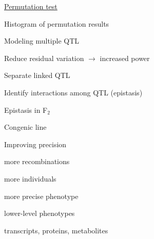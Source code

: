 \documentclass[12pt,t]{beamer}
\begin{document}
\begin{frame}[c]{\href{https://www.biostat.wisc.edu/~kbroman/presentations/SGN2017/perm_test}{\color{title} Permutation test}}


\end{frame}




\begin{frame}[c]{Histogram of permutation results}


\end{frame}


\begin{frame}[c]{Modeling multiple QTL}

\vspace{-20mm}

  \bbi
\item Reduce residual variation $\longrightarrow$ increased power
\item Separate linked QTL
\item Identify interactions among QTL {\lolit (epistasis)}
  \ei
\end{frame}





\begin{frame}[c]{Epistasis in F$_\text{2}$}


\end{frame}




\begin{frame}[c]{Congenic line}


\end{frame}



\begin{frame}[c]{Improving precision}

  \vspace{-20mm}

  \bbi
\item more recombinations
\item more individuals
\item more precise phenotype
\item lower-level phenotypes
\bi
\item transcripts, proteins, metabolites
  \ei
  \ei

\end{frame}
\end{document}
